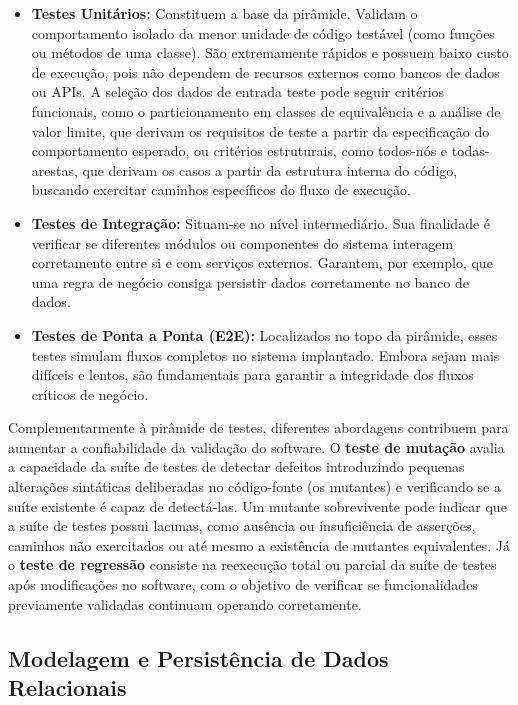 \documentclass[article,a4paper,12pt,brazil,sumario=tradicional]{abntex2}
\begin{document}
\begin{itemize}
    \item \textbf{Testes Unitários:} Constituem a base da pirâmide. Validam o comportamento isolado da menor unidade de código testável (como funções ou métodos de uma classe). São extremamente rápidos e possuem baixo custo de execução, pois não dependem de recursos externos como bancos de dados ou APIs. A seleção dos dados de entrada teste pode seguir critérios funcionais, como o particionamento em classes de equivalência e a análise de valor limite, que derivam os requisitos de teste a partir da especificação do comportamento esperado, ou critérios estruturais, como todos-nós e todas-arestas, que derivam os casos a partir da estrutura interna do código, buscando exercitar caminhos específicos do fluxo de execução.
    \item \textbf{Testes de Integração:} Situam-se no nível intermediário. Sua finalidade é verificar se diferentes módulos ou componentes do sistema interagem corretamente entre si e com serviços externos. Garantem, por exemplo, que uma regra de negócio consiga persistir dados corretamente no banco de dados.
    \item \textbf{Testes de Ponta a Ponta (E2E):} Localizados no topo da pirâmide, esses testes simulam fluxos completos no sistema implantado. Embora sejam mais difíceis e lentos, são fundamentais para garantir a integridade dos fluxos críticos de negócio.
\end{itemize}

Complementarmente à pirâmide de testes, diferentes abordagens contribuem para aumentar a confiabilidade da validação do software. O \textbf{teste de mutação} avalia a capacidade da suíte de testes de detectar defeitos introduzindo pequenas alterações sintáticas deliberadas no código-fonte (os mutantes) e verificando se a suíte existente é capaz de detectá-las. Um mutante sobrevivente pode indicar que a suíte de testes possui lacunas, como ausência ou insuficiência de asserções, caminhos não exercitados ou até mesmo a existência de mutantes equivalentes. Já o \textbf{teste de regressão} consiste na reexecução total ou parcial da suíte de testes após modificações no software, com o objetivo de verificar se funcionalidades previamente validadas continuam operando corretamente.

\subsection{Modelagem e Persistência de Dados Relacionais}
\end{document}
